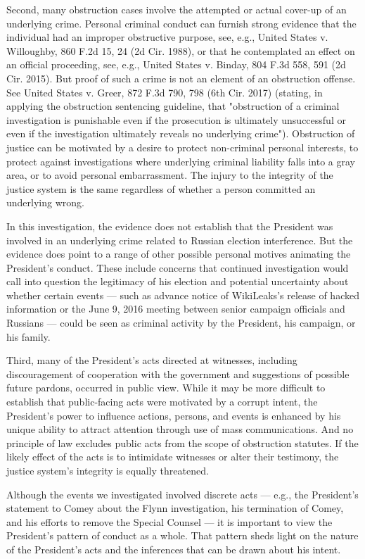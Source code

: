 {Second, many obstruction cases involve the attempted or actual cover-up of an underlying crime.
Personal criminal conduct can furnish strong evidence that the individual had an improper obstructive purpose, see, e.g., United States v. Willoughby, 860 F.2d 15, 24 (2d Cir. 1988), or that he contemplated an effect on an official proceeding, see, e.g., United States v. Binday, 804 F.3d 558, 591 (2d Cir. 2015).
But proof of such a crime is not an element of an obstruction offense.
See United States v. Greer, 872 F.3d 790, 798 (6th Cir. 2017) (stating, in applying the obstruction sentencing guideline, that "obstruction of a criminal investigation is punishable even if the prosecution is ultimately unsuccessful or even if the investigation ultimately reveals no underlying crime").
Obstruction of justice can be motivated by a desire to protect non-criminal personal interests, to protect against investigations where underlying criminal liability falls into a gray area, or to avoid personal embarrassment.
The injury to the integrity of the justice system is the same regardless of whether a person committed an underlying wrong.

In this investigation, the evidence does not establish that the President was involved in an underlying crime related to Russian election interference.
But the evidence does point to a range of other possible personal motives animating the President's conduct.
These include concerns that continued investigation would call into question the legitimacy of his election and potential uncertainty about whether certain events — such as advance notice of WikiLeaks's release of hacked information or the June 9, 2016 meeting between senior campaign officials and Russians — could be seen as criminal activity by the President, his campaign, or his family.

Third, many of the President's acts directed at witnesses, including discouragement of cooperation with the government and suggestions of possible future pardons, occurred in public view.
While it may be more difficult to establish that public-facing acts were motivated by a corrupt intent, the President's power to influence actions, persons, and events is enhanced by his unique ability to attract attention through use of mass communications.
And no principle of law excludes public acts from the scope of obstruction statutes.
If the likely effect of the acts is to intimidate witnesses or alter their testimony, the justice system's integrity is equally threatened.

Although the events we investigated involved discrete acts — e.g., the President's statement to Comey about the Flynn investigation, his termination of Comey, and his efforts to remove the Special Counsel — it is important to view the President's pattern of conduct as a whole.
That pattern sheds light on the nature of the President's acts and the inferences that can be drawn about his intent.

}
